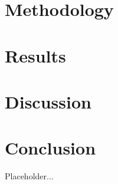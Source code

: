 \documentclass[10pt, a4paper, twocolumn]{article} %
\begin{document}
\section{Methodology}


\section{Results}


\section{Discussion}


\section{Conclusion}
Placeholder...

\color{black}
\clearpage
\printbibliography[title={Bibliography}] %


\end{document}
